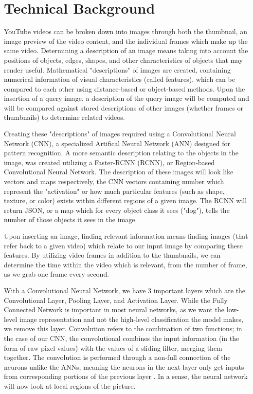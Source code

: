 \documentclass[10pt,twocolumn]{article}
\begin{document}
\section{Technical Background} 

YouTube videos can be broken down into images through both the thumbnail, an image preview of the video content, and the individual frames which make up the same video. Determining a description of an image means taking into account the positions of objects, edges, shapes, and other characteristics of objects that may render useful. Mathematical "descriptions" of images are created, containing numerical information of visual characteristics (called features), which can be compared to each other using distance-based or object-based methods. Upon the insertion of a query image, a description of the query image will be computed and will be compared against stored descriptions of other images (whether frames or thumbnails) to determine related videos.

Creating these "descriptions" of images required using a Convolutional Neural Network (CNN), a specialized Artifical Neural Network (ANN) designed for pattern recognition. A more semantic description relating to the objects in the image, was created utilizing a Faster-RCNN (RCNN), or Region-based Convolutional Neural Network. The description of these images will look like vectors and maps respectively, the CNN vectors containing number which represent the "activation" or how much particular features (such as shape, texture, or color) exists within different regions of a given image. The RCNN will return JSON, or a map which for every object class it sees ("dog"), tells the number of those objects it sees in the image.

Upon inserting an image, finding relevant information means finding images (that refer back to a given video) which relate to our input image by comparing these features. By utilizing video frames in addition to the thumbnails, we can determine the time within the video which is relevant, from the number of frame, as we grab one frame every second.

With a Convolutional Neural Network, we have 3 important layers which are the Convolutional Layer, Pooling Layer, and Activation Layer. While the Fully Connected Network is important in most neural networks, as we want the low-level image representation and not the high-level classification the model makes, we remove this layer. Convolution refers to the combination of two functions; in the case of our CNN, the convolutional combines the input information (in the form of raw pixel values) with the values of a sliding filter, merging them together. The convolution is performed through a non-full connection of the neurons unlike the ANNs, meaning the neurons in the next layer only get inputs from corresponding portions of the previous layer \cite{ALBAWI2017 TODO}. In a sense, the neural network will now look at local regions of the picture.
\end{document}
